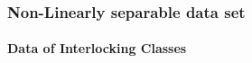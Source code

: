 \documentclass[a4paper]{article}
\begin{document}
		\subsubsection{Non-Linearly separable data set }
			
			\paragraph{Data of Interlocking Classes}
		
\end{document}
